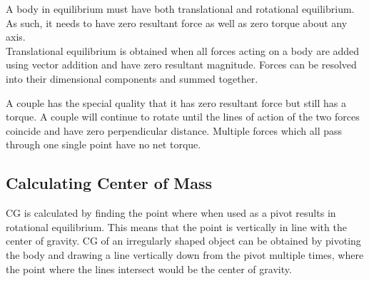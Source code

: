 \documentclass[../main]{subfiles}
\begin{document}
	A body in equilibrium must have both translational and rotational equilibrium. As such, it needs to have zero resultant force as well as zero torque about any axis. \\

	Translational equilibrium is obtained when all forces acting on a body are added using vector addition and have zero resultant magnitude. Forces can be resolved into their dimensional components and summed together. \\






	A couple has the special quality that it has zero resultant force but still has a torque. A couple will continue to rotate until the lines of action of the two forces coincide and have zero perpendicular distance. Multiple forces which all pass through one single point have no net torque.

	\subsection{Calculating Center of Mass}


	CG is calculated by finding the point where when used as a pivot results in rotational equilibrium. This means that the point is vertically in line with the center of gravity. CG of an irregularly shaped object can be obtained by pivoting the body and drawing a line vertically down from the pivot multiple times, where the point where the lines intersect would be the center of gravity.
\end{document}
